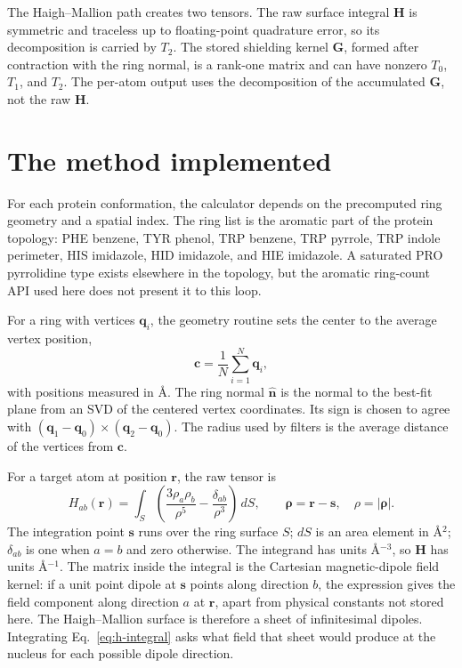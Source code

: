 \documentclass[11pt]{article}
\begin{document}
The Haigh--Mallion path creates two tensors. The raw surface integral
\(\bm H\) is symmetric and traceless up to floating-point quadrature error, so
its decomposition is carried by \(T_2\). The stored shielding kernel
\(\bm G\), formed after contraction with the ring normal, is a rank-one matrix
and can have nonzero \(T_0\), \(T_1\), and \(T_2\). The per-atom output uses the
decomposition of the accumulated \(\bm G\), not the raw \(\bm H\).

\section{The method implemented}

For each protein conformation, the calculator depends on the precomputed ring
geometry and a spatial index. The ring list is the aromatic part of the protein
topology: PHE benzene, TYR phenol, TRP benzene, TRP pyrrole, TRP indole
perimeter, HIS imidazole, HID imidazole, and HIE imidazole. A saturated PRO
pyrrolidine type exists elsewhere in the topology, but the aromatic ring-count
API used here does not present it to this loop.

For a ring with vertices \(\bm q_i\), the geometry routine sets the center to
the average vertex position,
\begin{equation}
  \bm c=\frac{1}{N}\sum_{i=1}^{N}\bm q_i ,
  \label{eq:center}
\end{equation}
with positions measured in \(\si{\angstrom}\). The ring normal
\(\hat{\bm n}\) is the normal to the best-fit plane from an SVD of the centered
vertex coordinates. Its sign is chosen to agree with
\((\bm q_1-\bm q_0)\times(\bm q_2-\bm q_0)\). The radius used by filters is
the average distance of the vertices from \(\bm c\).

For a target atom at position \(\bm r\), the raw tensor is
\begin{equation}
  H_{ab}(\bm r)
  =\int_{S}
  \left(
    \frac{3\rho_a\rho_b}{\rho^5}
    -\frac{\delta_{ab}}{\rho^3}
  \right)\,dS,
  \qquad
  \bm\rho=\bm r-\bm s,\quad \rho=|\bm\rho| .
  \label{eq:h-integral}
\end{equation}
The integration point \(\bm s\) runs over the ring surface \(S\);
\(dS\) is an area element in \(\si{\angstrom^2}\);
\(\delta_{ab}\) is one when \(a=b\) and zero otherwise. The integrand has units
\(\si{\angstrom^{-3}}\), so \(\bm H\) has units \(\si{\angstrom^{-1}}\).
The matrix inside the integral is the Cartesian magnetic-dipole field kernel:
if a unit point dipole at \(\bm s\) points along direction \(b\), the expression
gives the field component along direction \(a\) at \(\bm r\), apart from
physical constants not stored here. The Haigh--Mallion surface is therefore a
sheet of infinitesimal dipoles. Integrating Eq.~\eqref{eq:h-integral} asks what
field that sheet would produce at the nucleus for each possible dipole
direction.
\end{document}
